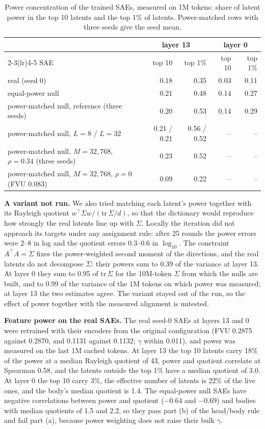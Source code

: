 \documentclass[10pt,twocolumn]{article}
\newcommand{\Sig}{\Sigma}
\begin{document}
\begin{table}[!htb]
\centering
\caption{Power concentration of the trained SAEs, measured on 1M tokens: share of latent power in the top 10 latents and the top 1\% of latents. Power-matched rows with three seeds give the seed mean.}
\label{tab:manip}
\small
\begin{tabular}{l rr rr}
\toprule
 & \multicolumn{2}{c}{layer 13} & \multicolumn{2}{c}{layer 0} \\
\cmidrule(lr){2-3}\cmidrule(lr){4-5}
SAE & top 10 & top 1\% & top 10 & top 1\% \\
\midrule
real (seed 0) & 0.18 & 0.35 & 0.03 & 0.11 \\
equal-power null & 0.21 & 0.48 & 0.14 & 0.27 \\
power-matched null, reference (three seeds) & 0.20 & 0.53 & 0.14 & 0.29 \\
power-matched null, $L=8$ / $L=32$ & 0.21 / 0.21 & 0.56 / 0.52 & -- & -- \\
power-matched null, $M=32{,}768$, $\rho=0.34$ (three seeds) & 0.23 & 0.52 & -- & -- \\
power-matched null, $M=32{,}768$, $\rho=0$ (FVU 0.083) & 0.09 & 0.22 & -- & -- \\
\bottomrule
\end{tabular}
\end{table}

\textbf{A variant not run.} We also tried matching each latent's power together with its Rayleigh quotient $w^\top\Sig w/(\mathrm{tr}\,\Sig/d)$, so that the dictionary would reproduce how strongly the real latents line up with $\Sig$. Locally the iteration did not approach its targets under any assignment rule: after 25 rounds the power errors were 2--8 in log and the quotient errors 0.3--0.6 in $\log_{10}$. The constraint $A^\top A=\Sig$ fixes the power-weighted second moment of the directions, and the real latents do not decompose $\Sig$: their powers sum to 0.39 of the variance at layer 13. At layer 0 they sum to 0.95 of $\mathrm{tr}\,\Sig$ for the 10M-token $\Sig$ from which the nulls are built, and to 0.99 of the variance of the 1M tokens on which power was measured; at layer 13 the two estimates agree. The variant stayed out of the run, so the effect of power together with the measured alignment is untested.

\textbf{Feature power on the real SAEs.} The real seed-0 SAEs at layers 13 and 0 were retrained with their encoders from the original configuration (FVU 0.2875 against 0.2870, and 0.1131 against 0.1132; $\gamma$ within 0.011), and power was measured on the last 1M cached tokens. At layer 13 the top 10 latents carry 18\% of the power at a median Rayleigh quotient of 43, power and quotient correlate at Spearman 0.58, and the latents outside the top 1\% have a median quotient of 3.0. At layer 0 the top 10 carry 3\%, the effective number of latents is 22\% of the live ones, and the body's median quotient is 1.4. The equal-power null SAEs have negative correlations between power and quotient ($-0.64$ and $-0.69$) and bodies with median quotients of 1.5 and 2.2, so they pass part (b) of the head/body rule and fail part (a), because power weighting does not raise their bulk $\gamma$.
\end{document}
